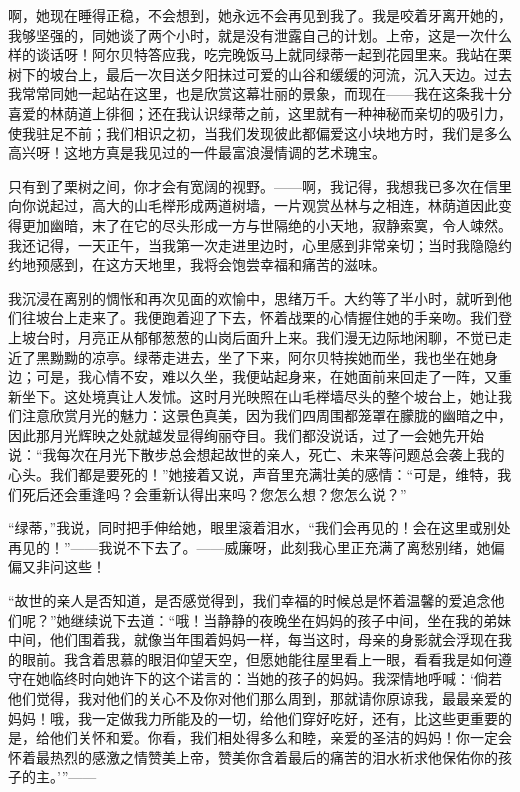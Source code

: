 \documentclass[12pt,oneside]{book}
\begin{document}
啊，她现在睡得正稳，不会想到，她永远不会再见到我了。我是咬着牙离开她的，我够坚强的，同她谈了两个小时，就是没有泄露自己的计划。上帝，这是一次什么样的谈话呀！阿尔贝特答应我，吃完晚饭马上就同绿蒂一起到花园里来。我站在栗树下的坡台上，最后一次目送夕阳抹过可爱的山谷和缓缓的河流，沉入天边。过去我常常同她一起站在这里，也是欣赏这幕壮丽的景象，而现在——我在这条我十分喜爱的林荫道上徘徊；还在我认识绿蒂之前，这里就有一种神秘而亲切的吸引力，使我驻足不前；我们相识之初，当我们发现彼此都偏爱这小块地方时，我们是多么高兴呀！这地方真是我见过的一件最富浪漫情调的艺术瑰宝。

只有到了栗树之间，你才会有宽阔的视野。——啊，我记得，我想我已多次在信里向你说起过，高大的山毛榉形成两道树墙，一片观赏丛林与之相连，林荫道因此变得更加幽暗，末了在它的尽头形成一方与世隔绝的小天地，寂静索寞，令人竦然。我还记得，一天正午，当我第一次走进里边时，心里感到非常亲切；当时我隐隐约约地预感到，在这方天地里，我将会饱尝幸福和痛苦的滋味。

我沉浸在离别的惆怅和再次见面的欢愉中，思绪万千。大约等了半小时，就听到他们往坡台上走来了。我便跑着迎了下去，怀着战栗的心情握住她的手亲吻。我们登上坡台时，月亮正从郁郁葱葱的山岗后面升上来。我们漫无边际地闲聊，不觉已走近了黑黝黝的凉亭。绿蒂走进去，坐了下来，阿尔贝特挨她而坐，我也坐在她身边；可是，我心情不安，难以久坐，我便站起身来，在她面前来回走了一阵，又重新坐下。这处境真让人发怵。这时月光映照在山毛榉墙尽头的整个坡台上，她让我们注意欣赏月光的魅力：这景色真美，因为我们四周围都笼罩在朦胧的幽暗之中，因此那月光辉映之处就越发显得绚丽夺目。我们都没说话，过了一会她先开始说：“我每次在月光下散步总会想起故世的亲人，死亡、未来等问题总会袭上我的心头。我们都是要死的！”她接着又说，声音里充满壮美的感情：“可是，维特，我们死后还会重逢吗？会重新认得出来吗？您怎么想？您怎么说？”

“绿蒂，”我说，同时把手伸给她，眼里滚着泪水，“我们会再见的！会在这里或别处再见的！”——我说不下去了。——威廉呀，此刻我心里正充满了离愁别绪，她偏偏又非问这些！

“故世的亲人是否知道，是否感觉得到，我们幸福的时候总是怀着温馨的爱追念他们呢？”她继续说下去道：“哦！当静静的夜晚坐在妈妈的孩子中间，坐在我的弟妹中间，他们围着我，就像当年围着妈妈一样，每当这时，母亲的身影就会浮现在我的眼前。我含着思慕的眼泪仰望天空，但愿她能往屋里看上一眼，看看我是如何遵守在她临终时向她许下的这个诺言的：当她的孩子的妈妈。我深情地呼喊：‘倘若他们觉得，我对他们的关心不及你对他们那么周到，那就请你原谅我，最最亲爱的妈妈！哦，我一定做我力所能及的一切，给他们穿好吃好，还有，比这些更重要的是，给他们关怀和爱。你看，我们相处得多么和睦，亲爱的圣洁的妈妈！你一定会怀着最热烈的感激之情赞美上帝，赞美你含着最后的痛苦的泪水祈求他保佑你的孩子的主。’”——
\end{document}
